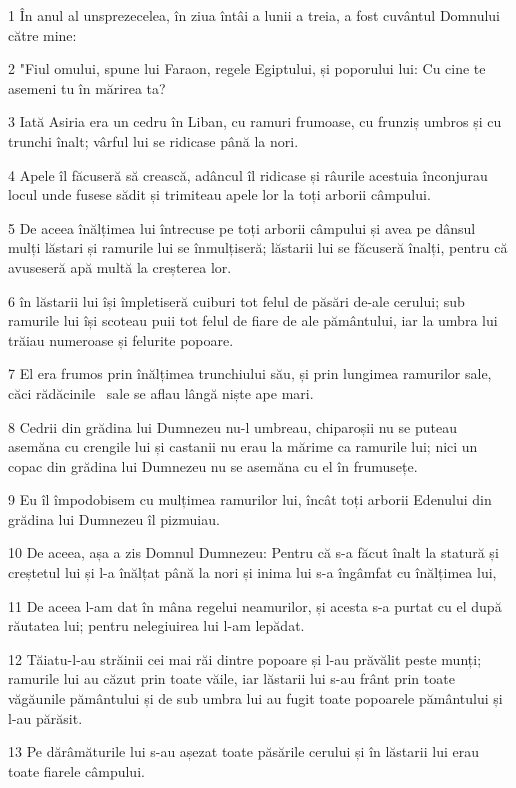 \par 1 În anul al unsprezecelea, în ziua întâi a lunii a treia, a fost cuvântul Domnului către mine:
\par 2 "Fiul omului, spune lui Faraon, regele Egiptului, și poporului lui: Cu cine te asemeni tu în mărirea ta?
\par 3 Iată Asiria era un cedru în Liban, cu ramuri frumoase, cu frunziș umbros și cu trunchi înalt; vârful lui se ridicase până la nori.
\par 4 Apele îl făcuseră să crească, adâncul îl ridicase și râurile acestuia înconjurau locul unde fusese sădit și trimiteau apele lor la toți arborii câmpului.
\par 5 De aceea înălțimea lui întrecuse pe toți arborii câmpului și avea pe dânsul mulți lăstari și ramurile lui se înmulțiseră; lăstarii lui se făcuseră înalți, pentru că avuseseră apă multă la creșterea lor.
\par 6 în lăstarii lui își împletiseră cuiburi tot felul de păsări de-ale cerului; sub ramurile lui își scoteau puii tot felul de fiare de ale pământului, iar la umbra lui trăiau numeroase și felurite popoare.
\par 7 El era frumos prin înălțimea trunchiului său, și prin lungimea ramurilor sale, căci rădăcinile  sale se aflau lângă niște ape mari.
\par 8 Cedrii din grădina lui Dumnezeu nu-l umbreau, chiparoșii nu se puteau asemăna cu crengile lui și castanii nu erau la mărime ca ramurile lui; nici un copac din grădina lui Dumnezeu nu se asemăna cu el în frumusețe.
\par 9 Eu îl împodobisem cu mulțimea ramurilor lui, încât toți arborii Edenului din grădina lui Dumnezeu îl pizmuiau.
\par 10 De aceea, așa a zis Domnul Dumnezeu: Pentru că s-a făcut înalt la statură și creștetul lui și l-a înălțat până la nori și inima lui s-a îngâmfat cu înălțimea lui,
\par 11 De aceea l-am dat în mâna regelui neamurilor, și acesta s-a purtat cu el după răutatea lui; pentru nelegiuirea lui l-am lepădat.
\par 12 Tăiatu-l-au străinii cei mai răi dintre popoare și l-au prăvălit peste munți; ramurile lui au căzut prin toate văile, iar lăstarii lui s-au frânt prin toate văgăunile pământului și de sub umbra lui au fugit toate popoarele pământului și l-au părăsit.
\par 13 Pe dărâmăturile lui s-au așezat toate păsările cerului și în lăstarii lui erau toate fiarele câmpului.
